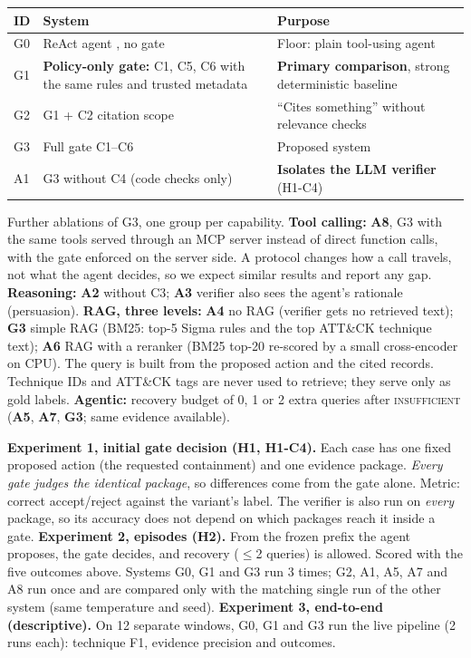 \documentclass[11pt,a4paper]{article}
\begin{document}
{\small
\begin{tabularx}{\linewidth}{@{}p{0.7cm}LL@{}}
\toprule
\textbf{ID} & \textbf{System} & \textbf{Purpose}\\
\midrule
G0 & ReAct agent \cite{react}, no gate & Floor: plain tool-using agent \\
G1 & \textbf{Policy-only gate:} C1, C5, C6 with the same rules and trusted metadata & \textbf{Primary comparison}, strong deterministic baseline \\
G2 & G1 + C2 citation scope & ``Cites something'' without relevance checks \\
G3 & Full gate C1--C6 & Proposed system \\
A1 & G3 without C4 (code checks only) & \textbf{Isolates the LLM verifier} (H1-C4) \\
\bottomrule
\end{tabularx}}
Further ablations of G3, one group per capability.
\textbf{Tool calling:} \textbf{A8}, G3 with the same tools served through an MCP server \cite{mcp} instead of direct function calls, with the gate enforced on the server side. A protocol changes how a call travels, not what the agent decides, so we expect similar results and report any gap.
\textbf{Reasoning:} \textbf{A2} without C3; \textbf{A3} verifier also sees the agent's rationale (persuasion).
\textbf{RAG, three levels:} \textbf{A4} no RAG (verifier gets no retrieved text); \textbf{G3} simple RAG (BM25: top-5 Sigma rules and the top ATT\&CK technique text); \textbf{A6} RAG with a reranker (BM25 top-20 re-scored by a small cross-encoder \cite{reranker} on CPU). The query is built from the proposed action and the cited records. Technique IDs and ATT\&CK tags are never used to retrieve; they serve only as gold labels.
\textbf{Agentic:} recovery budget of 0, 1 or 2 extra queries after \textsc{insufficient} (\textbf{A5}, \textbf{A7}, \textbf{G3}; same evidence available).

\textbf{Experiment 1, initial gate decision (H1, H1-C4).} Each case has one fixed proposed action (the requested containment) and one evidence package. \emph{Every gate judges the identical package}, so differences come from the gate alone. Metric: correct accept/reject against the variant's label. The verifier is also run on \emph{every} package, so its accuracy does not depend on which packages reach it inside a gate.
\textbf{Experiment 2, episodes (H2).} From the frozen prefix the agent proposes, the gate decides, and recovery ($\leq$2 queries) is allowed. Scored with the five outcomes above. Systems G0, G1 and G3 run 3 times; G2, A1, A5, A7 and A8 run once and are compared only with the matching single run of the other system (same temperature and seed).
\textbf{Experiment 3, end-to-end (descriptive).} On 12 separate windows, G0, G1 and G3 run the live pipeline (2 runs each): technique F1, evidence precision and outcomes.
\end{document}
